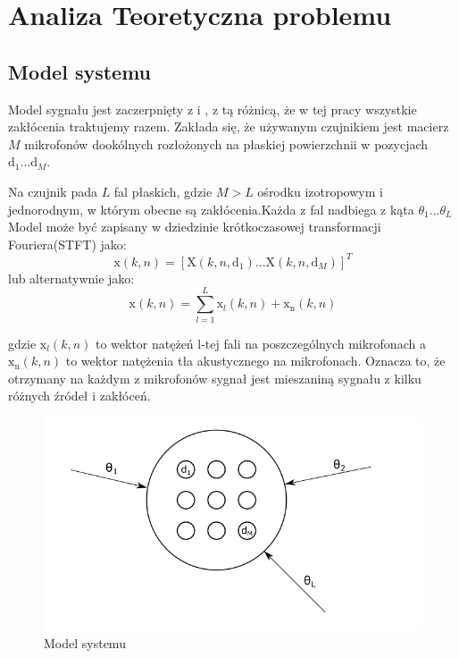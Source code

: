 \chapter{Analiza Teoretyczna problemu}
\label{chapter-2}
\section{Model systemu}

Model sygnału jest zaczerpnięty z \cite{Thiergart2013} i \cite{Braun2014}, z tą różnicą, że w tej pracy wszystkie zakłócenia traktujemy razem.
Zakłada się, że używanym czujnikiem jest macierz $M$ mikrofonów dookólnych rozłożonych na płaskiej powierzchnii w pozycjach $\bm{\mathrm{d}}_1...\bm{\mathrm{d}}_M$.

Na czujnik pada $L$ fal płaskich, gdzie $M > L$ ośrodku izotropowym i jednorodnym, w którym obecne są zakłócenia.Każda z fal nadbiega z kąta ${\theta}_1...{\theta}_L$ Model może być zapisany w dziedzinie krótkoczasowej transformacji Fouriera(STFT) jako:
\begin{equation}
    \label{equation:2.1}
    \bm{\mathrm{x}}(k,n)
    =
    [\mathrm{X}(k,n,\bm{\mathrm{d}}_{1})
    ...
    \mathrm{X}(k,n,\bm{\mathrm{d}}_{M})]^{T}
\end{equation}
lub alternatywnie jako:
\begin{equation}
    \label{equation:2.2}
    \bm{\mathrm{x}}(k,n)=
    \sum_{l=1}^{L} \bm{\mathrm{x}}_{l}(k,n)
    + \bm{\mathrm{x}}_{\mathrm{n}}(k,n)
\end{equation}

\noindent gdzie $\bm{\mathrm{x}}_l(k,n)$ to wektor natężeń l-tej fali na poszczególnych mikrofonach a $\bm{\mathrm{x}}_{\mathrm{n}}(k,n)$ to wektor natężenia tła akustycznego na mikrofonach.
Oznacza to, że otrzymany na każdym z mikrofonów sygnał jest mieszaniną sygnału z kilku różnych źródeł i zakłóceń.

\begin{figure}[h]
    \centering
    \includegraphics[width=\textwidth]{Images/model.png}
    \caption{Model systemu}
    \label{fig:model}
\end{figure}

